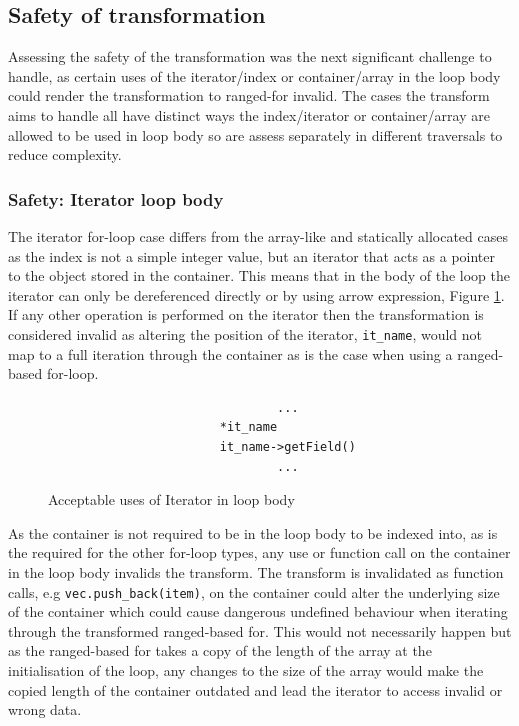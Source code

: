 \documentclass[bsc,frontabs,singlespacing,twoside,parskip,deptreport]{infthesis}
\begin{document}


\subsection{Safety of transformation}\label{sec:safety-of-trans}

Assessing the safety of the transformation was the next significant challenge to handle, as certain uses of the iterator/index or container/array in the loop body could render the transformation to ranged-for invalid. The cases the transform aims to handle all have distinct ways the index/iterator or container/array are allowed to be used in loop body so are assess separately in different traversals to reduce complexity.

\subsubsection{Safety: Iterator loop body}\label{sec:safe-iter}

The iterator for-loop case differs from the array-like and statically allocated cases as the index is not a simple integer value, but an iterator that acts as a pointer to the object stored in the container. This means that in the body of the loop the iterator can only be dereferenced directly or by using arrow expression, Figure \ref{fig:code-iter-uses}. If any other operation is performed on the iterator then the transformation is considered invalid as altering the position of the iterator, \texttt{it\_name}, would not map to a full iteration through the container as is the case when using a ranged-based for-loop. 

\begin{figure}[h]
    \centering
    \begin{verbatim}
                                ...
                        *it_name
                        it_name->getField()
                                ...
    \end{verbatim}
    \caption{Acceptable uses of Iterator in loop body}
    \label{fig:code-iter-uses}
\end{figure}

As the container is not required to be in the loop body to be indexed into, as is the required for the other for-loop types, any use or function call on the container in the loop body invalids the transform. The transform is invalidated as function calls, e.g \texttt{vec.push\_back(item)}, on the container could alter the underlying size of the container which could cause dangerous undefined behaviour when iterating through the transformed ranged-based for. This would not necessarily happen but as the ranged-based for takes a copy of the length of the array at the initialisation of the loop, any changes to the size of the array would make the copied length of the container outdated and lead the iterator to access invalid or wrong data. 
\end{document}
